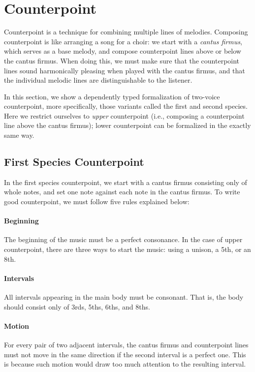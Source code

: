 \section{Counterpoint}
\label{sec:cp}

Counterpoint is a technique for combining multiple lines of melodies.
Composing counterpoint is like arranging a song for a choir:
we start with a \emph{cantus firmus}, which serves as a base melody,
and compose counterpoint lines above or below the cantus firmus.
When doing this, we must make sure that the counterpoint lines sound
harmonically pleasing when played with the cantus firmus,
and that the individual melodic lines are distinguishable to the listener.

In this section, we show a dependently typed formalization of
two-voice counterpoint, more specifically,
those variants called the first and second species.
Here we restrict ourselves to \emph{upper} counterpoint
(i.e., composing a counterpoint line above the cantus firmus);
lower counterpoint can be formalized in the exactly same way.

\subsection{First Species Counterpoint}
\label{sec:cp:fs}

In the first species counterpoint, we start with a cantus firmus
consisting only of whole notes,
and set one note against each note in the cantus firmus.
To write good counterpoint, we must follow five rules explained below:

\paragraph{Beginning}
The beginning of the music must be a perfect consonance.
In the case of upper counterpoint, there are three ways to start the music:
using a unison, a 5th, or an 8th.

\paragraph{Intervals}
All intervals appearing in the main body must be consonant.
That is, the body should consist only of 3rds, 5ths, 6ths, and 8ths.

\paragraph{Motion}
For every pair of two adjacent intervals, the cantus firmus and counterpoint
lines must not move in the same direction if the second interval is a perfect one.
This is because such motion would draw too much attention
to the resulting interval.

